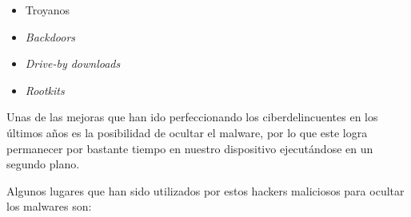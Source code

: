 \documentclass[12pt]{article}
\newcommand{\newpar} {
    \vskip 1cm
}
\begin{document}
            \begin{itemize}
                \item Troyanos
                \item \textit{Backdoors}
                \item \textit{Drive-by downloads}
                \item \textit{Rootkits}
            \end{itemize}

            \newpar

            Unas de las mejoras que han ido perfeccionando los ciberdelincuentes en los últimos años es la posibilidad de ocultar el malware, por lo que este logra permanecer por bastante tiempo en nuestro dispositivo ejecutándose en un segundo plano.

            \newpar

            Algunos lugares que han sido utilizados por estos hackers maliciosos para ocultar los malwares son:

\end{document}
